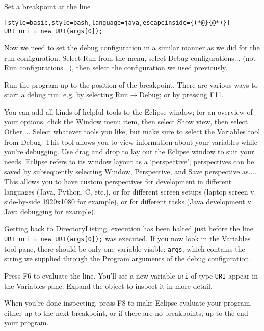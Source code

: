 Set a breakpoint at the line
\begin{lstlisting}[style=basic,style=bash,language=java,escapeinside={(*@}{@*)}]
URI uri = new URI(args[0]);
\end{lstlisting}

Now we need to set the debug configuration in a similar manner as we did for the run configuration. Select \textsf{Run} from the menu, select \textsf{Debug configurations...} (not \textsf{Run configurations...}), then select the configuration we used previously.

Run the program up to the position of the breakpoint. There are various ways to start a debug run: e.g. by selecting \textsf{Run}$\rightarrow$\textsf{Debug}; or by pressing \textsf{F11}.

You can add all kinds of helpful tools to the Eclipse window; for an overview of your options, click the \textsf{Window} menu item, then select \textsf{Show view}, then select \textsf{Other...}. Select whatever tools you like, but make sure to select the \textsf{Variables} tool from \textsf{Debug}. This tool allows you to view information about your variables while you're debugging. Use drag and drop to lay out the Eclipse window to suit your needs. Eclipse refers to its window layout as a `perspective'; perspectives can be saved by subsequently selecting \textsf{Window}, \textsf{Perspective}, and \textsf{Save perspective as...}. This allows you to have custom perspectives for development in different languages (Java, Python, C, etc.), or for different screen setups (laptop screen v. side-by-side 1920x1080 for example), or for different tasks (Java development v. Java debugging for example).

Getting back to \textsf{DirectoryListing}, execution has been halted just before the line \texttt{URI uri = new URI(args[0]);} was executed. If you now look in the \textsf{Variables} tool pane, there should be only one variable visible: \texttt{args}, which contains the string we supplied through the \textsf{Program arguments} of the debug configuration.

Press \textsf{F6} to evaluate the line. You'll see a new variable \texttt{uri} of type \texttt{URI} appear in the \textsf{Variables} pane. Expand the object to inspect it in more detail.

When you're done inspecting, press \textsf{F8} to make Eclipse evaluate your program, either up to the next breakpoint, or if there are no breakpoints, up to the end your program.

